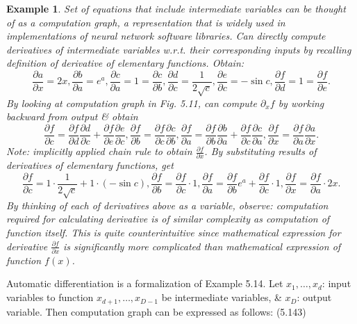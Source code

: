 \documentclass{article}
\newtheorem{example}{Example}
\begin{document}
\begin{enumerate}
\begin{itemize}
\begin{itemize}
\begin{itemize}
\begin{example}
					Set of equations that include intermediate variables can be thought of as a computation graph, a representation that is widely used in implementations of neural network software libraries. Can directly compute derivatives of intermediate variables w.r.t. their corresponding inputs by recalling definition of derivative of elementary functions. Obtain:
					\begin{equation}
						\frac{\partial a}{\partial x} = 2x,\frac{\partial b}{\partial a} = e^a,\frac{\partial c}{\partial a} = 1 = \frac{\partial c}{\partial b},\frac{\partial d}{\partial c} = \frac{1}{2\sqrt{c}},\frac{\partial e}{\partial c} = -\sin c,\frac{\partial f}{\partial d} = 1 = \frac{\partial f}{\partial e}.
					\end{equation}
					By looking at computation graph in Fig. 5.11, can compute $\partial_xf$ by working backward from output \& obtain
					\begin{equation}
						\frac{\partial f}{\partial c} = \frac{\partial f}{\partial d}\frac{\partial d}{\partial c} + \frac{\partial f}{\partial e}\frac{\partial e}{\partial c},\frac{\partial f}{\partial b} = \frac{\partial f}{\partial c}\frac{\partial c}{\partial b},\frac{\partial f}{\partial a} = \frac{\partial f}{\partial b}\frac{\partial b}{\partial a} + \frac{\partial f}{\partial c}\frac{\partial c}{\partial a},\frac{\partial f}{\partial x} = \frac{\partial f}{\partial a}\frac{\partial a}{\partial x}.
					\end{equation}
					Note: implicitly applied chain rule to obtain $\frac{\partial f}{\partial x}$. By substituting results of derivatives of elementary functions, get
					\begin{equation}
						\frac{\partial f}{\partial c} = 1\cdot\frac{1}{2\sqrt{c}} + 1\cdot(-\sin c),\frac{\partial f}{\partial b} = \frac{\partial f}{\partial c}\cdot1,\frac{\partial f}{\partial a} = \frac{\partial f}{\partial b}e^a + \frac{\partial f}{\partial c}\cdot1,\frac{\partial f}{\partial x} = \frac{\partial f}{\partial a}\cdot2x.
					\end{equation}
					By thinking of each of derivatives above as a variable, observe: computation required for calculating derivative is of similar complexity as computation of function itself. This is quite counterintuitive since mathematical expression for derivative $\frac{\partial f}{\partial x}$ is significantly more complicated than mathematical expression of function $f(x)$.
				\end{example}
				Automatic differentiation is a formalization of Example 5.14. Let $x_1,\ldots,x_d$: input variables to function $x_{d+1},\ldots,x_{D-1}$ be intermediate variables, \& $x_D$: output variable. Then computation graph can be expressed as follows: (5.143)

\end{itemize}
\end{itemize}
\end{itemize}
\end{enumerate}
\end{document}
